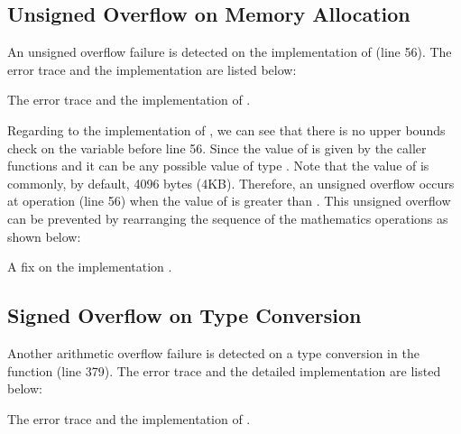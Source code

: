 \subsection{Unsigned Overflow on Memory Allocation}
An unsigned overflow failure is detected on the implementation of  (line 56). The error trace and the implementation are listed below:

\begin{listing}[ht]

\caption{The error trace and the implementation of .}
\end{listing}

Regarding to the implementation of , we can see that there is no upper bounds check on the variable  before line 56. Since the value of  is given by the caller functions and it can be any possible value of type . Note that the value of  is commonly, by default, 4096 bytes (4KB). Therefore, an unsigned overflow occurs at  operation (line 56) when the value of  is greater than .
This unsigned overflow can be prevented by rearranging the sequence of the mathematics operations as shown below:

\begin{listing}[ht]
\caption{A fix on the implementation .}
\end{listing}


\subsection{Signed Overflow on Type Conversion}
Another arithmetic overflow failure is detected on a type conversion in the function  (line 379). The error trace and the detailed implementation are listed below: 

\begin{listing}[H]

\caption{The error trace and the implementation of .}
\end{listing}

